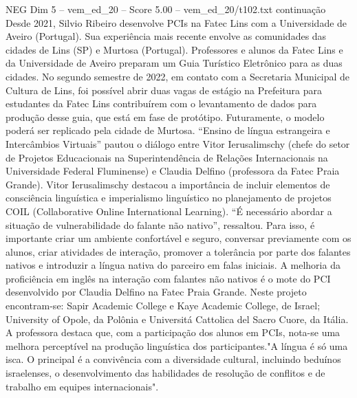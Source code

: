 \begin{textsample}{NEG Dim 5 – vem\_ed\_20 – Score 5.00 – vem\_ed\_20/t102.txt}  \label{ex:f5_neg_066}
continuação Desde 2021, Silvio Ribeiro desenvolve PCIs na Fatec Lins com a Universidade de Aveiro (Portugal).
Sua experiência mais recente envolve as comunidades das cidades de Lins (SP) e Murtosa (Portugal).
Professores e alunos da Fatec Lins e da Universidade de Aveiro preparam um Guia Turístico Eletrônico para as duas cidades.
No segundo semestre de 2022, em contato com a Secretaria Municipal de Cultura de Lins, foi possível abrir duas vagas de estágio na Prefeitura para estudantes da Fatec Lins contribuírem com o levantamento de dados para produção desse guia, que está em fase de protótipo.
Futuramente, o modelo poderá ser replicado pela cidade de Murtosa. “Ensino de língua estrangeira e Intercâmbios Virtuais” pautou o diálogo entre Vitor Ierusalimschy (chefe do setor de Projetos Educacionais na Superintendência de Relações Internacionais na Universidade Federal Fluminense) e Claudia Delfino (professora da Fatec Praia Grande).
Vitor Ierusalimschy destacou a importância de incluir elementos de consciência linguística e imperialismo linguístico no planejamento de projetos COIL (Collaborative Online International Learning). “É necessário abordar a situação de vulnerabilidade do falante não nativo”, ressaltou.
Para isso, é importante criar um ambiente confortável e seguro, conversar previamente com os alunos, criar atividades de interação, promover a tolerância por parte dos falantes nativos e introduzir a língua nativa do parceiro em falas iniciais.
A melhoria da proficiência em inglês na interação com falantes não nativos é o mote do PCI desenvolvido por Claudia Delfino na Fatec Praia Grande.
Neste projeto encontram-se: Sapir Academic College e Kaye Academic College, de Israel; University of Opole, da Polônia e Universitá Cattolica del Sacro Cuore, da Itália.
A professora destaca que, com a participação dos alunos em PCIs, nota-se uma melhora perceptível na produção linguística dos participantes."A língua é só uma isca.
O principal é a convivência com a diversidade cultural, incluindo beduínos israelenses, o desenvolvimento das habilidades de resolução de conflitos e de trabalho em equipes internacionais".

\end{textsample}
